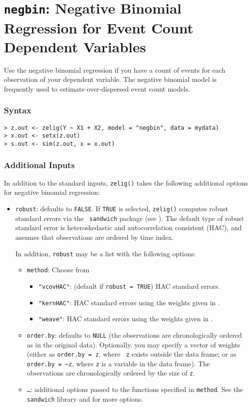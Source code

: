 \section{{\tt negbin}: Negative Binomial Regression for Event
Count Dependent Variables}\label{negbin}

Use the negative binomial regression if you have a count of events for
each observation of your dependent variable.  The negative binomial
model is frequently used to estimate over-dispersed event count
models.

\subsubsection{Syntax}

\begin{verbatim}
> z.out <- zelig(Y ~ X1 + X2, model = "negbin", data = mydata)
> x.out <- setx(z.out)
> s.out <- sim(z.out, x = x.out)
\end{verbatim}

\subsubsection{Additional Inputs} 

In addition to the standard inputs, {\tt zelig()} takes the following
additional options for negative binomial regression:  
\begin{itemize}
\item {\tt robust}: defaults to {\tt FALSE}.  If {\tt TRUE} is
selected, {\tt zelig()} computes robust standard errors via the {\tt
sandwich} package (see \cite{Zeileis04}).  The default type of robust
standard error is heteroskedastic and autocorrelation consistent (HAC),
and assumes that observations are ordered by time index.

In addition, {\tt robust} may be a list with the following options:  
\begin{itemize}
\item {\tt method}:  Choose from 
\begin{itemize}
\item {\tt "vcovHAC"}: (default if {\tt robust = TRUE}) HAC standard
errors. 
\item {\tt "kernHAC"}: HAC standard errors using the
weights given in \cite{Andrews91}. 
\item {\tt "weave"}: HAC standard errors using the
weights given in \cite{LumHea99}.  
\end{itemize}  
\item {\tt order.by}: defaults to {\tt NULL} (the observations are
chronologically ordered as in the original data).  Optionally, you may
specify a vector of weights (either as {\tt order.by = z}, where {\tt
z} exists outside the data frame; or as {\tt order.by = \~{}z}, where
{\tt z} is a variable in the data frame).  The observations are
chronologically ordered by the size of {\tt z}.
\item {\tt \dots}:  additional options passed to the functions 
specified in {\tt method}.   See the {\tt sandwich} library and
\cite{Zeileis04} for more options.   
\end{itemize}
\end{itemize}

